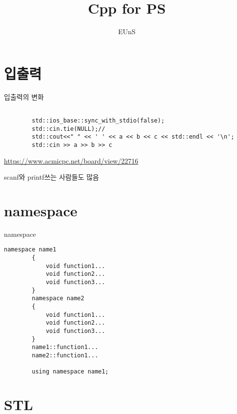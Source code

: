 \documentclass[10pt]{beamer}
\title{Cpp for PS}
\author{EUnS}
\begin{document}
\begin{frame}
  \maketitle
\end{frame}


\begin{frame}
	\tableofcontents
\end{frame}
\section{입출력}
\begin{frame}[fragile]{입출력의 변화}
    \begin{lstlisting}[style = CStyle]
    
        std::ios_base::sync_with_stdio(false); 
        std::cin.tie(NULL);//
        std::cout<<" " << ' ' << a << b << c << std::endl << '\n';
        std::cin >> a >> b >> c 
    \end{lstlisting}
    \url{https://www.acmicpc.net/board/view/22716}

    scanf와 printf쓰는 사람들도 많음
\end{frame}

\section{namespace}


\begin{frame}[fragile]{namespace}
    \begin{lstlisting}[style = CStyle]
        namespace name1
        {
            void function1...
            void function2...
            void function3...
        }
        namespace name2
        {
            void function1...
            void function2...
            void function3...
        }
        name1::function1...
        name2::function1...

        using namespace name1;
    \end{lstlisting}
\end{frame}



\section{STL}
\end{document}

